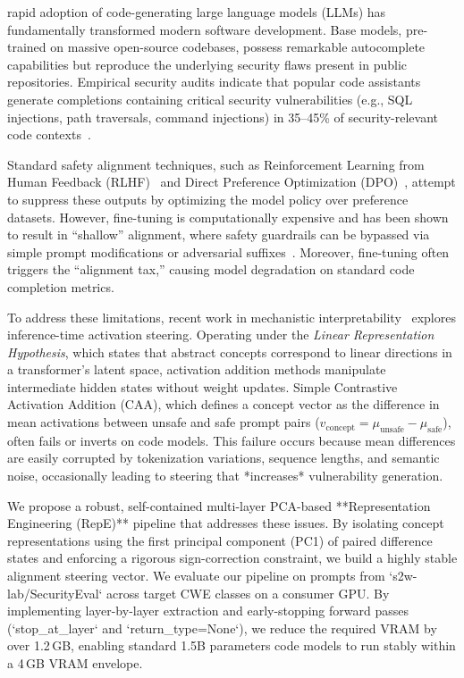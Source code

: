 \documentclass[journal, onecolumn]{IEEEtran}
\begin{document}
 rapid adoption of code-generating large language models (LLMs) has fundamentally transformed modern software development. Base models, pre-trained on massive open-source codebases, possess remarkable autocomplete capabilities but reproduce the underlying security flaws present in public repositories. Empirical security audits indicate that popular code assistants generate completions containing critical security vulnerabilities (e.g., SQL injections, path traversals, command injections) in 35--45\% of security-relevant code contexts~\cite{pearce2022, bhatt2024}.

Standard safety alignment techniques, such as Reinforcement Learning from Human Feedback (RLHF)~\cite{ouyang2022} and Direct Preference Optimization (DPO)~\cite{rafailov2023}, attempt to suppress these outputs by optimizing the model policy over preference datasets. However, fine-tuning is computationally expensive and has been shown to result in ``shallow'' alignment, where safety guardrails can be bypassed via simple prompt modifications or adversarial suffixes~\cite{zou2023, wei2024}. Moreover, fine-tuning often triggers the ``alignment tax,'' causing model degradation on standard code completion metrics.

To address these limitations, recent work in mechanistic interpretability~\cite{elhage2022, turner2023, rimsky2024} explores inference-time activation steering. Operating under the \textit{Linear Representation Hypothesis}, which states that abstract concepts correspond to linear directions in a transformer's latent space, activation addition methods manipulate intermediate hidden states without weight updates. Simple Contrastive Activation Addition (CAA), which defines a concept vector as the difference in mean activations between unsafe and safe prompt pairs ($v_{\text{concept}} = \mu_{\text{unsafe}} - \mu_{\text{safe}}$), often fails or inverts on code models. This failure occurs because mean differences are easily corrupted by tokenization variations, sequence lengths, and semantic noise, occasionally leading to steering that *increases* vulnerability generation.

We propose a robust, self-contained multi-layer PCA-based **Representation Engineering (RepE)** pipeline that addresses these issues. By isolating concept representations using the first principal component (PC1) of paired difference states and enforcing a rigorous sign-correction constraint, we build a highly stable alignment steering vector. We evaluate our pipeline on prompts from `s2w-lab/SecurityEval` across target CWE classes on a consumer GPU. By implementing layer-by-layer extraction and early-stopping forward passes (`stop_at_layer` and `return_type=None`), we reduce the required VRAM by over 1.2\,GB, enabling standard 1.5B parameters code models to run stably within a 4\,GB VRAM envelope.
\end{document}
